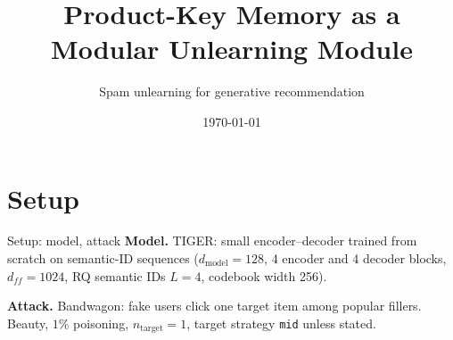 \documentclass{beamer}
\title{Product-Key Memory as a Modular Unlearning Module}
\subtitle{Spam unlearning for generative recommendation}
\date{\today}
\begin{document}
\maketitle


\section{Setup}

\begin{frame}{Setup: model, attack}
\textbf{Model.} TIGER: small encoder--decoder trained from
scratch on semantic-ID sequences ($d_{\text{model}}=128$, 4 encoder and 4 decoder blocks, $d_{ff}=1024$, RQ semantic IDs $L=4$, codebook width 256).

\textbf{Attack.} Bandwagon: fake users click one target item among popular
fillers. Beauty, $1\%$ poisoning, $n_{\text{target}}=1$, target strategy
\texttt{mid} unless stated.

\end{frame}
\end{document}
